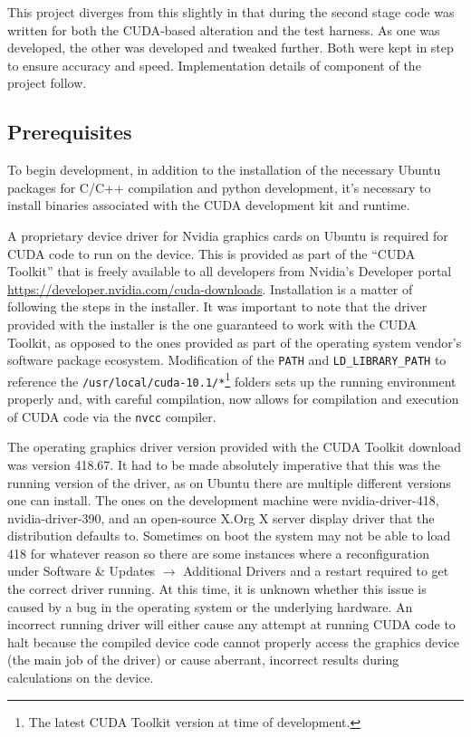 \documentclass[conference]{IEEEtran}
\begin{document}
This project diverges from this slightly in that during the second stage code was written for both the CUDA-based alteration and the test harness. As one was developed, the other was developed and tweaked further. Both were kept in step to ensure accuracy and speed. Implementation details of component of the project follow.


\subsection{Prerequisites}
\label{subsec:imp_prerequisites}

To begin development, in addition to the installation of the necessary Ubuntu packages for C/C++ compilation and python development, it's necessary to install binaries associated with the CUDA development kit and runtime.

A proprietary device driver for Nvidia graphics cards on Ubuntu is required for CUDA code to run on the device. This is provided as part of the ``CUDA Toolkit'' that is freely available to all developers from Nvidia's Developer portal \url{https://developer.nvidia.com/cuda-downloads}. Installation is a matter of following the steps in the installer. It was important to note that the driver provided with the installer is the one guaranteed to work with the CUDA Toolkit, as opposed to the ones provided as part of the operating system vendor's software package ecosystem. Modification of the \texttt{PATH} and \texttt{LD\_LIBRARY\_PATH} to reference the \texttt{/usr/local/cuda-10.1/*}\footnote{The latest CUDA Toolkit version at time of development.} folders sets up the running environment properly and, with careful compilation, now allows for compilation and execution of CUDA code via the \texttt{nvcc} compiler.

The operating graphics driver version provided with the CUDA Toolkit download was version 418.67. It had to be made absolutely imperative that this was the running version of the driver, as on Ubuntu there are multiple different versions one can install. The ones on the development machine were nvidia-driver-418, nvidia-driver-390, and an open-source X.Org X server display driver that the distribution defaults to. Sometimes on boot the system may not be able to load 418 for whatever reason so there are some instances where a reconfiguration under Software \& Updates $\rightarrow$ Additional Drivers and a restart required to get the correct driver running. At this time, it is unknown whether this issue is caused by a bug in the operating system or the underlying hardware. An incorrect running driver will either cause any attempt at running CUDA code to halt because the compiled device code cannot properly access the graphics device (the main job of the driver) or cause aberrant, incorrect results during calculations on the device.
\end{document}
